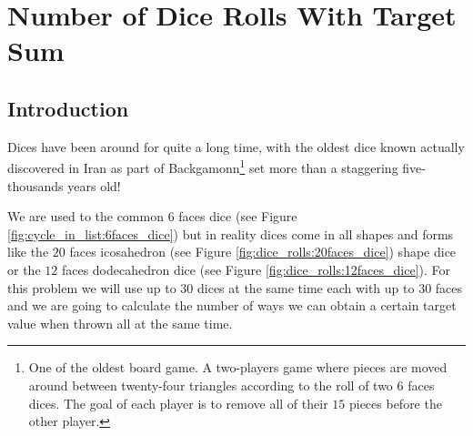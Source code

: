 %

\chapter{Number of Dice Rolls With Target Sum}
\label{ch:dice_rolls}
\section*{Introduction}
Dices have been around for quite a long time, with the oldest dice known actually discovered in Iran 
as part of Backgamonn\footnote{One of the oldest board game. A two-players game where pieces are moved around between twenty-four triangles according to the roll of two $6$ faces dices. The goal of each player is to remove all of their $15$ pieces before the other player.}
set more than a staggering five-thousands years old! 

We are used to the common $6$ faces dice (see Figure \ref{fig:cycle_in_list:6faces_dice}) 
but in reality dices come in all shapes and forms like the $20$ faces icosahedron (see Figure \ref{fig:dice_rolls:20faces_dice}) shape dice or the $12$ faces dodecahedron dice (see Figure \ref{fig:dice_rolls:12faces_dice}).
For this problem we will use up to $30$ dices at the same time each with up to $30$ faces and we are going to calculate the number of ways 
we can obtain a certain target value when thrown all at the same time.



